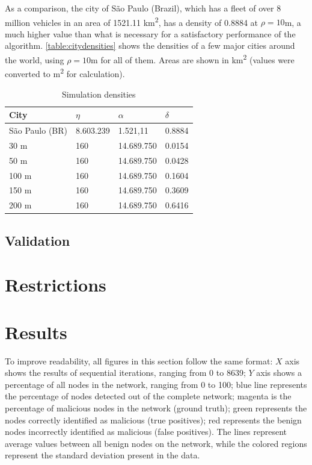 As a comparison, the city of São Paulo (Brazil), which has a fleet of over 8 million vehicles in an area of 1521.11 km\textsuperscript{2}, has a density of 0.8884 at $\rho = 10$m, a much higher value than what is necessary for a satisfactory performance of the algorithm.
\autoref{table:citydensities} shows the densities of a few major cities around the world, using $\rho = 10$m for all of them.
Areas are shown in km\textsuperscript{2} (values were converted to m\textsuperscript{2} for calculation).

\begin{table}[h!]
\caption{Simulation densities}
\label{table:citydensities}
\centering
\begin{tabular}{|p{3cm}||p{4cm}|p{4cm}|p{2cm}|}
 \hline
 \textbf{City} & \textbf{$\eta$} & $\alpha$ & $\delta$ \\
 \hline
 \hline
 São Paulo (BR) & 8.603.239 & 1.521,11 & 0.8884 \\
 \hline
 30 m & 160 & 14.689.750 & 0.0154 \\
 \hline
 50 m & 160 & 14.689.750 & 0.0428 \\
 \hline
 100 m & 160 & 14.689.750 & 0.1604 \\
 \hline
 150 m & 160 & 14.689.750 & 0.3609 \\
 \hline
 200 m & 160 & 14.689.750 & 0.6416 \\
 \hline
\end{tabular}
\end{table}

\subsection{Validation}

\section{Restrictions}
\label{section:restrictions}

\section{Results}
\label{section:results}

To improve readability, all figures in this section follow the same format:
$X$ axis shows the results of sequential iterations, ranging from 0 to 8639;
$Y$ axis shows a percentage of all nodes in the network, ranging from 0 to 100;
blue line represents the percentage of nodes detected out of the complete network;
magenta is the percentage of malicious nodes in the network (ground truth);
green represents the nodes correctly identified as malicious (true positives);
red represents the benign nodes incorrectly identified as malicious (false positives).
The lines represent average values between all benign nodes on the network, while the colored regions represent the standard deviation present in the data.

